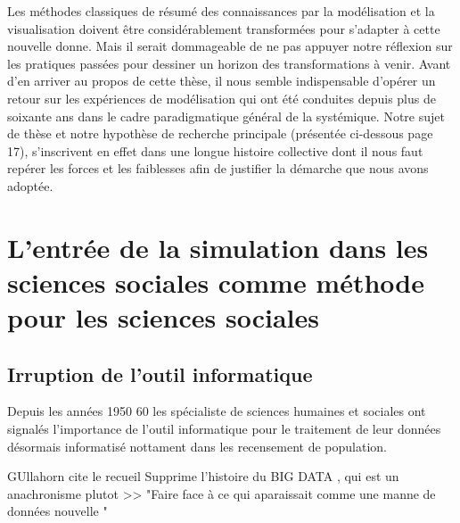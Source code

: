 Les méthodes classiques de résumé des connaissances par la modélisation et la visualisation doivent être considérablement transformées pour s’adapter à cette nouvelle donne. Mais il serait dommageable de ne pas appuyer notre réflexion sur les pratiques passées pour dessiner un horizon des transformations à venir. Avant d’en arriver au propos de cette thèse, il nous semble indispensable d’opérer un retour sur les expériences de modélisation qui ont été conduites depuis plus de soixante ans dans le cadre paradigmatique général de la systémique. Notre sujet de thèse et notre hypothèse de recherche principale (présentée ci-dessous page 17), s’inscrivent en effet dans une longue histoire collective dont il nous faut repérer les forces et les faiblesses afin de justifier la démarche que nous avons adoptée. 

\section{L'entrée de la simulation dans les sciences sociales comme méthode pour les sciences sociales}


\subsection{Irruption de l'outil informatique }

Depuis les années 1950 60 les spécialiste de sciences humaines et sociales ont signalés l'importance de l'outil informatique pour le traitement de leur données désormais informatisé nottament dans les recensement de population.

GUllahorn cite le recueil 
Supprime l'histoire du BIG DATA , qui est un anachronisme plutot >> "Faire face à ce qui aparaissait comme une manne de données nouvelle "

